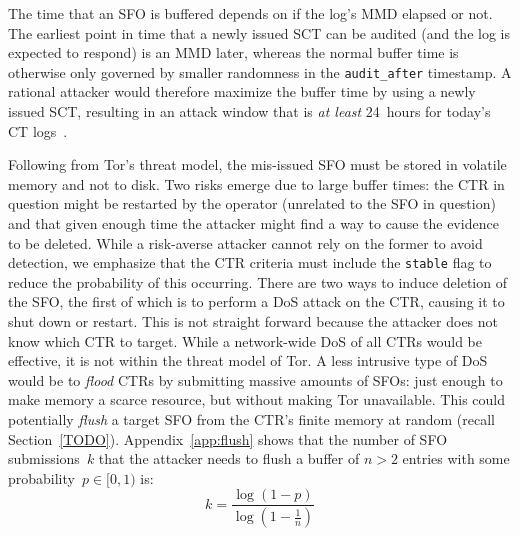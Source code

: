 The time that an SFO is buffered depends on if the log's MMD elapsed or not.
The earliest point in time that a newly issued SCT can be audited (and the log
is expected to respond) is an MMD later, whereas the normal buffer time is
otherwise only governed by smaller randomness in the \texttt{audit\_after}
timestamp.  A rational attacker would therefore maximize the buffer time by
using a newly issued SCT, resulting in an attack window that is \emph{at least}
24~hours for today's CT logs~\cite{google-log-policy}.


Following from Tor's threat model, the mis-issued SFO must be stored in volatile
memory and not to disk.  Two risks emerge due to large buffer times:
	the CTR in question might be restarted by the operator (unrelated to the SFO in question)
	and that given enough time the attacker might find a way to cause the evidence to be deleted.
While a risk-averse attacker cannot rely on the former to avoid detection, we
emphasize that the CTR criteria must include the \texttt{stable} flag to reduce the
probability of this occurring.
There are two ways to induce deletion of the SFO, the first of which is to perform a DoS
attack on the CTR, causing it to shut down or restart. This is not straight forward because
the attacker does not know which CTR
to target.  While a network-wide DoS of all CTRs would be effective, it is not within the
threat model of Tor.  A less intrusive type of DoS would be to \emph{flood} CTRs
by submitting massive amounts of SFOs:
	just enough to make memory a scarce resource, but
	without making Tor unavailable.
This could potentially \emph{flush} a target SFO from the CTR's finite memory
at random (recall Section~\ref{TODO}).  Appendix~\ref{app:flush} shows that the
number of SFO submissions~$k$ that the attacker needs to flush a buffer of $n>2$
entries with some probability~$p\in[0,1)$ is:
\begin{equation} \label{eq:flush}
	k = \frac{\log(1-p)}{\log(1 - \frac{1}{n})}
\end{equation}

